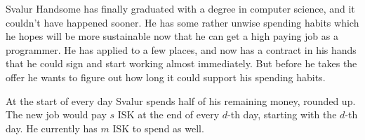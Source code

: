 

Svalur Handsome has finally graduated with a degree in computer
science, and it couldn't have happened sooner. He has some
rather unwise spending habits which he hopes will be more
sustainable now that he can get a high paying job as a programmer.
He has applied to a few places, and now has a contract in his
hands that he could sign and start working almost immediately.
But before he takes the offer he wants to figure out
how long it could support his spending habits.

At the start of every day Svalur spends half of his remaining
money, rounded up. The new job would pay $s$ ISK at the end
of every $d$-th day, starting with the $d$-th day. 
He currently has $m$ ISK to spend as well.

